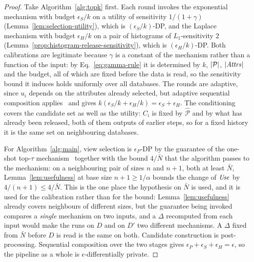 \begin{proof}
Take Algorithm~\ref{alg:topk} first.
Each round invokes the exponential mechanism with budget $\epsilon_S/k$ on a utility of sensitivity $1/(1+\gamma)$ (Lemma~\ref{lem:selection-utility}), which is $(\epsilon_S/k)$-DP, and the Laplace mechanism with budget $\epsilon_H/k$ on a pair of histograms of $L_1$-sensitivity $2$ (Lemma~\ref{prop:histogram-release-sensitivity}), which is $(\epsilon_H/k)$-DP.
Both calibrations are legitimate because $\gamma$ is a constant of the mechanism rather than a function of the input: by Eq.~\eqref{eq:gamma-rule} it is determined by $k$, $|\mathcal{P}|$, $|\mathit{Attrs}|$ and the budget, all of which are fixed before the data is read, so the sensitivity bound it induces holds uniformly over all databases.
The rounds are adaptive, since $u_i$ depends on the attributes already selected, but adaptive sequential composition applies~\cite{DBLP:series/synthesis/2016Li} and gives $k(\epsilon_S/k+\epsilon_H/k)=\epsilon_S+\epsilon_H$.
The conditioning covers the candidate set as well as the utility: $C_i$ is fixed by $\widehat{\mathcal{P}}$ and by what has already been released, both of them outputs of earlier steps, so for a fixed history it is the same set on neighbouring databases.

For Algorithm~\ref{alg:main}, view selection is $\epsilon_P$-DP by the guarantee of the one-shot top-$\tau$ mechanism~\cite{DurfeeRogers19} together with the bound $4/\bar N$ that the algorithm passes to the mechanism: on a neighbouring pair of sizes $n$ and $n+1$, both at least $\bar N$, Lemma~\ref{lem:usefulness} at base size $n+1\ge1/\alpha$ bounds the change of $\mathit{Use}$ by $4/(n+1)\le4/\bar N$.
This is the one place the hypothesis on $\bar N$ is used, and it is used for the calibration rather than for the bound: Lemma~\ref{lem:usefulness} already covers neighbours of different sizes, but the guarantee being invoked compares a \emph{single} mechanism on two inputs, and a $\Delta$ recomputed from each input would make the runs on $D$ and on $D'$ two different mechanisms.
A $\Delta$ fixed from $\bar N$ before $D$ is read is the same on both.
Candidate construction is post-processing.
Sequential composition over the two stages gives $\epsilon_P+\epsilon_S+\epsilon_H=\epsilon$, so the pipeline as a whole is $\epsilon$-differentially private.
\end{proof}

